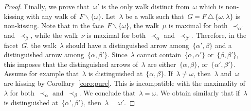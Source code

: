 \documentclass{amsart}
\theoremstyle{definition}
\newcommand{\ssm}{\smallsetminus} %
\newcommand{\symdif}{\,\triangle\,} %
\begin{document}
\begin{proof}
Finally, we prove that~$\omega'$ is the only walk distinct from~$\omega$ which is non-kissing with any walk of~$F \ssm \{\omega\}$.
Let~$\lambda$ be a walk such that~$G = F \symdif \{\omega, \lambda\}$ is non-kissing.
Note that in the face~$F \ssm \{\omega\}$, the walk~$\mu$ is maximal for both~$\prec_{\alpha'}$ and~$\prec_\beta$, while the walk~$\nu$ is maximal for both~$\prec_\alpha$ and~$\prec_{\beta'}$.
Therefore, in the facet~$G$, the walk~$\lambda$ should have a distinguished arrow among~$\{\alpha', \beta\}$ and a distinguished arrow among~$\{\alpha, \beta'\}$.
Since~$\lambda$ cannot contain~$\{\alpha, \alpha'\}$ or~$\{\beta, \beta'\}$, this imposes that the distinguished arrows of~$\lambda$ are either~$\{\alpha, \beta\}$, or~$\{\alpha', \beta'\}$.
Assume for example that~$\lambda$ is distinguished at~$\{\alpha, \beta\}$.
If~$\lambda \ne \omega$, then~$\lambda$ and~$\omega$ are kissing by Corollary~\ref{coro:pure}.
This is incompatible with the maximality of~$\lambda$ for both~$\prec_\alpha$ and~$\prec_\beta$.
We conclude that~$\lambda = \omega$.
We obtain similarly that if~$\lambda$ is distinguished at~$\{\alpha', \beta'\}$, then~$\lambda = \omega'$.
\end{proof}
\end{document}
